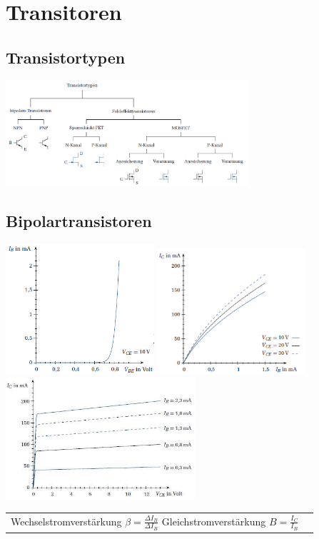 \section{Transitoren}
	\subsection{Transistortypen}
	\includegraphics[width=9cm]{images/Transistortypen.png}

\subsection{Bipolartransistoren}
\includegraphics[width=5.5cm]{images/bipolarEingangsKennlinie}
\includegraphics[width=5.5cm]{images/bipolarVerstaerkungsKennlinie}
\includegraphics[width=7cm]{images/bipolarAusgangsKennlinie}\\
\begin{tabular}{ll}
	Wechselstromverstärkung $\beta = \frac{\Delta I_B}{\Delta I_B} $
	Gleichstromverstärkung $B = \frac{I_C}{I_B}$\\
\end{tabular}


